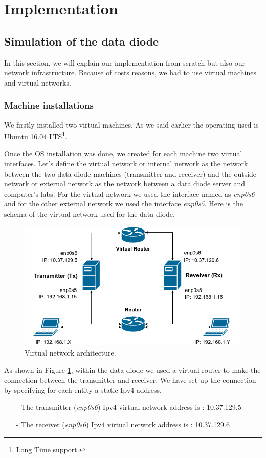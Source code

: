 \documentclass[a4paper,10pt]{article}
\begin{document}
\section{Implementation}
\subsection{Simulation of the data diode}
In this section, we will explain our implementation from scratch but also our network infrastructure. Because of costs reasons, we had to use virtual machines and virtual networks. 

\subsubsection{Machine installations}
We firstly installed two virtual machines. As we said earlier the operating used is Ubuntu 16.04 LTS\footnote{Long Time support.}. 

Once the OS installation was done, we created for each machine two virtual interfaces. Let's define the virtual network or internal network as the network between the two data diode machines (transmitter and receiver) and the outside network or external network as the network between a data diode server and computer's labs. For the virtual network we used the interface named as \emph{enp0s6} and for the other external network we used the interface \emph{enp0s5}. Here is the schema of the virtual network used for the data diode. 

\begin{figure}[!h]
\centering
\includegraphics[scale=0.5]{images/network.png}
\caption{Virtual network architecture.}
\label{fig:netvirt}
\end{figure}

As shown in Figure \ref{fig:netvirt}, within the data diode we used a virtual router to make the connection between the transmitter and receiver. We have set up the connection by specifying for each entity a static Ipv4 address. 
\begin{enumerate}
\item[-] The transmitter (\emph{enp0s6}) Ipv4 virtual network address is : 10.37.129.5
\item[-] The receiver (\emph{enp0s6}) Ipv4 virtual network address is : 10.37.129.6
\end{enumerate}
\end{document}
